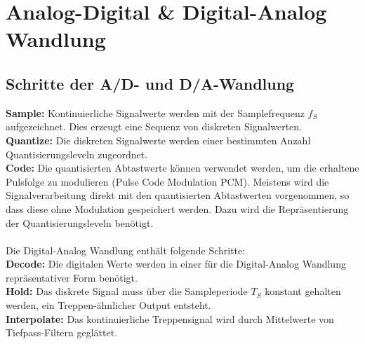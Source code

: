 



\chapter{Analog-Digital \& Digital-Analog Wandlung}
\section{Schritte der A/D- und D/A-Wandlung}
\textbf{Sample:} Kontinuierliche Signalwerte werden mit der Samplefrequenz
$f_S$ aufgezeichnet. Dies erzeugt eine Sequenz von diskreten Signalwerten.\\
\textbf{Quantize:} Die diskreten Signalwerte werden einer bestimmten
Anzahl Quantisierungsleveln zugeordnet.\\
\textbf{Code:} Die quantisierten Abtastwerte können verwendet werden,
um die erhaltene Pulsfolge zu modulieren (Pulse Code Modulation PCM). Meistens
wird die Signalverarbeitung direkt mit den quantisierten Abtastwerten vorgenommen,
so dass diese ohne Modulation gespeichert werden. Dazu wird die Repräsentierung
der Quantisierungsleveln benötigt.\\\\
Die Digital-Analog Wandlung enthält folgende Schritte:\\
\textbf{Decode:} Die digitalen Werte werden in einer für die Digital-Analog
Wandlung repräsentativer Form benötigt.\\
\textbf{Hold:} Das diskrete Signal muss über die Sampleperiode $T_S$ konstant
gehalten werden, ein Treppen-ähnlicher Output entsteht.\\
\textbf{Interpolate:} Das kontinuierliche Treppensignal wird durch Mittelwerte
von Tiefpass-Filtern geglättet.

